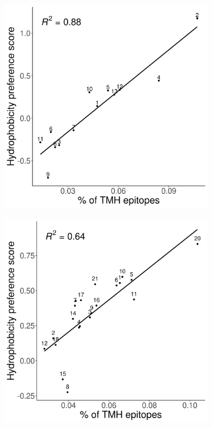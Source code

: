 \begin{figure}[!htbp]
  \begin{subfigure}[t]{0.35\textwidth}
    \centering
    \caption{}
    \includegraphics[width=\linewidth]{bbbq_1_smart_results/fig_hydrophobicity_mhc1_bw.png}
    \label{fig:hydrophobicity_1}
  \end{subfigure}  
  \hfill
  \begin{subfigure}[t]{0.35\textwidth}
    \centering
    \caption{}
    \includegraphics[width=\linewidth]{bbbq_1_smart_results/fig_hydrophobicity_mhc2_bw.png}

\end{subfigure}
\end{figure}
